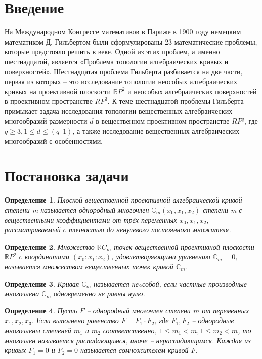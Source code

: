 \documentclass[14pt]{article}
\newtheorem{definition}{Определение}
\newcommand{\RomanNumeralCaps}[1]
    {\MakeUppercase{\romannumeral #1}}
\begin{document}
\newpage
\section{Введение}


        На \RomanNumeralCaps{2} Международном Конгрессе математиков в Париже в 1900 году немецким математиком Д. Гильбертом были сформулированы 23 математические проблемы, которые предстояло решить в \RomanNumeralCaps{20} веке. Одной из этих проблем, а именно шестнадцатой, является «Проблема топологии алгебраических кривых и поверхностей». Шестнадцатая проблема Гильберта разбивается на две части, первая из которых – это исследование топологии неособых алгебраических кривых на проективной плоскости $\mathbb RP^2$ и неособых алгебраических поверхностей в проективном пространстве $RP^3$. К теме шестнадцатой проблемы Гильберта примыкает задача исследования топологии вещественных алгебраических многообразий размерности $d$ в вещественном проективном пространстве $RP^q$, где $q \geqslant 3, 1 \leqslant d \leqslant (q–1)$, а также исследование вещественных алгебраических многообразий с особенностями.
\newpage
\section{Постановка задачи}

\begin{definition}
 Плоской вещественной проективной алгебраической кривой степени m называется однородный многочлен $\mathbb C_m(x_0, x_1, x_2)$ степени m с вещественными коэффициентами от трёх переменных $x_0, x_1, x_2$, рассматриваемый с точностью до ненулевого постоянного множителя.
\end{definition}

\begin{definition}
Множество $\mathbb RC_m$ точек вещественной проективной плоскости $\mathbb RP^2$ с координатами $(x_0:x_1:x_2)$, удовлетворяющими уравнению $\mathbb C_m = 0$, называется множеством вещественных точек кривой $\mathbb C_m$.
\end{definition}

\begin{definition}
Кривая $\mathbb C_m$ называется неoсобой, если частные производные многочлена $\mathbb C_m$ одновременно не равны нулю.
\end{definition}

\begin{definition}
Пусть $F$ – однородный многочлен степени $m$ от переменных $x_1, x_2, x_3$. Если выполнено равенство $F = F_1 \cdot F_2$, где $F_1, F_2$ – однородные многочлены степеней $m_1$ и $m_2$ соответственно, $1 \leqslant m_1 < m, 1 \leqslant m_2 < m$, то многочлен называется распадающимся, иначе -- нераспадающимся. Каждая из кривых $F_1 = 0$ и $F_2 = 0$ называется сомножителем кривой $F$.
\end{definition}
\end{document}
